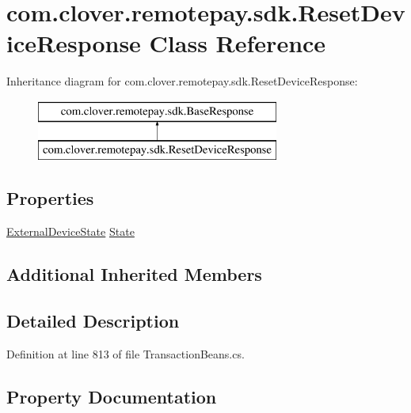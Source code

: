 \hypertarget{classcom_1_1clover_1_1remotepay_1_1sdk_1_1_reset_device_response}{}\section{com.\+clover.\+remotepay.\+sdk.\+Reset\+Device\+Response Class Reference}
\label{classcom_1_1clover_1_1remotepay_1_1sdk_1_1_reset_device_response}
Inheritance diagram for com.\+clover.\+remotepay.\+sdk.\+Reset\+Device\+Response\+:\begin{figure}[H]
\begin{center}
\leavevmode
\includegraphics[height=2.000000cm]{classcom_1_1clover_1_1remotepay_1_1sdk_1_1_reset_device_response}
\end{center}
\end{figure}
\subsection*{Properties}
\begin{DoxyCompactItemize}
\item 
\hyperlink{namespacecom_1_1clover_1_1remotepay_1_1sdk_a9d5838a91e2711306ad561d104fed034}{External\+Device\+State} \hyperlink{classcom_1_1clover_1_1remotepay_1_1sdk_1_1_reset_device_response_ac9afc35f4074129aad891e3f3d3dc79a}{State}
\end{DoxyCompactItemize}
\subsection*{Additional Inherited Members}


\subsection{Detailed Description}


Definition at line 813 of file Transaction\+Beans.\+cs.



\subsection{Property Documentation}
\mbox{\label{classcom_1_1clover_1_1remotepay_1_1sdk_1_1_reset_device_response_ac9afc35f4074129aad891e3f3d3dc79a}} 
